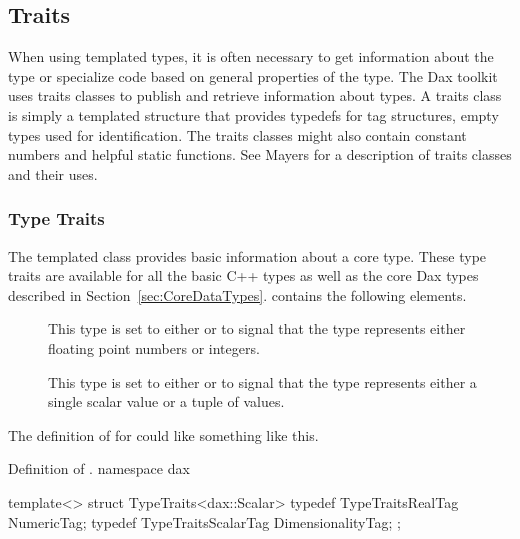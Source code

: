 \subsection{Traits}
\label{sec:Traits}


When using templated types, it is often necessary to get information about
the type or specialize code based on general properties of the type. The
Dax toolkit uses traits classes to publish and retrieve information about
types. A traits class is simply a templated structure that provides
typedefs for tag structures, empty types used for
identification. The traits classes might also contain constant numbers and
helpful static functions. See Mayers for a description of
traits classes and their uses.

\subsubsection{Type Traits}

The  templated class provides basic information
about a core type. These type traits are available for all the basic C++
types as well as the core Dax types described in
Section~\ref{sec:CoreDataTypes}.  contains the following
elements.

\begin{description}
\item[]  This type is set to
  either  or  to signal
  that the type represents either floating point numbers or integers.
\item[]  This
  type is set to either  or
   to signal that the type represents either a
  single scalar value or a tuple of values.
\end{description}

The definition of  for  could like something
like this.
\begin{daxexample}{Definition of \protect {}.}
namespace dax {

template<>
struct TypeTraits<dax::Scalar>
{
  typedef TypeTraitsRealTag NumericTag;
  typedef TypeTraitsScalarTag DimensionalityTag;
};

}
\end{daxexample}

